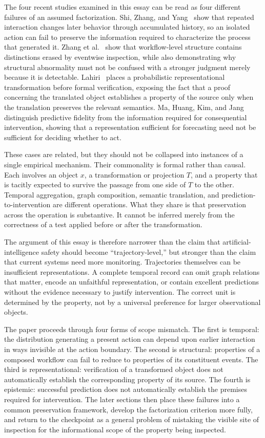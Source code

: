 \documentclass[11pt]{article}
\begin{document}
The four recent studies examined in this essay can be read as four different failures of an assumed factorization. Shi, Zhang, and Yang~\cite{shi2026} show that repeated interaction changes later behavior through accumulated history, so an isolated action can fail to preserve the information required to characterize the process that generated it. Zhang et al.~\cite{zhang2026} show that workflow-level structure contains distinctions erased by eventwise inspection, while also demonstrating why structural abnormality must not be confused with a stronger judgment merely because it is detectable. Lahiri~\cite{lahiri2026} places a probabilistic representational transformation before formal verification, exposing the fact that a proof concerning the translated object establishes a property of the source only when the translation preserves the relevant semantics. Ma, Huang, Kim, and Jang~\cite{ma2026} distinguish predictive fidelity from the information required for consequential intervention, showing that a representation sufficient for forecasting need not be sufficient for deciding whether to act.

These cases are related, but they should not be collapsed into instances of a single empirical mechanism. Their commonality is formal rather than causal. Each involves an object $x$, a transformation or projection $T$, and a property that is tacitly expected to survive the passage from one side of $T$ to the other. Temporal aggregation, graph composition, semantic translation, and prediction-to-intervention are different operations. What they share is that preservation across the operation is substantive. It cannot be inferred merely from the correctness of a test applied before or after the transformation.

The argument of this essay is therefore narrower than the claim that artificial-intelligence safety should become ``trajectory-level,'' but stronger than the claim that current systems need more monitoring. Trajectories themselves can be insufficient representations. A complete temporal record can omit graph relations that matter, encode an unfaithful representation, or contain excellent predictions without the evidence necessary to justify intervention. The correct unit is determined by the property, not by a universal preference for larger observational objects.

The paper proceeds through four forms of scope mismatch. The first is temporal: the distribution generating a present action can depend upon earlier interaction in ways invisible at the action boundary. The second is structural: properties of a composed workflow can fail to reduce to properties of its constituent events. The third is representational: verification of a transformed object does not automatically establish the corresponding property of its source. The fourth is epistemic: successful prediction does not automatically establish the premises required for intervention. The later sections then place these failures into a common preservation framework, develop the factorization criterion more fully, and return to the checkpoint as a general problem of mistaking the visible site of inspection for the informational scope of the property being inspected.
\end{document}
